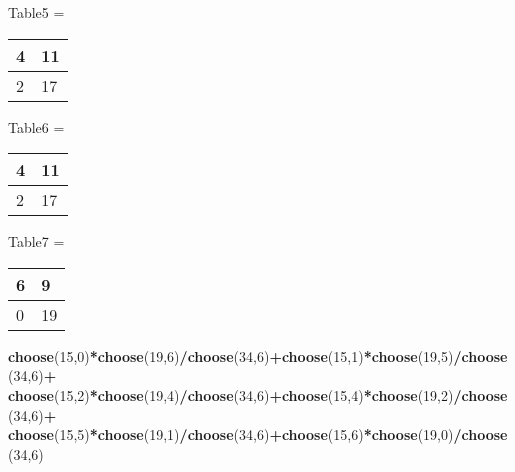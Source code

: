 \documentclass[]{article}
\newenvironment{Shaded}{\begin{snugshade}}{\end{snugshade}}
\newcommand{\KeywordTok}[1]{\textcolor[rgb]{0.13,0.29,0.53}{\textbf{#1}}}
\newcommand{\DecValTok}[1]{\textcolor[rgb]{0.00,0.00,0.81}{#1}}
\newcommand{\StringTok}[1]{\textcolor[rgb]{0.31,0.60,0.02}{#1}}
\newcommand{\OperatorTok}[1]{\textcolor[rgb]{0.81,0.36,0.00}{\textbf{#1}}}
\newcommand{\NormalTok}[1]{#1}
\begin{document}
Table5 =

\begin{longtable}[]{@{}ll@{}}
\toprule
4 & 11\tabularnewline
\midrule
\endhead
2 & 17\tabularnewline
\bottomrule
\end{longtable}

Table6 =

\begin{longtable}[]{@{}ll@{}}
\toprule
4 & 11\tabularnewline
\midrule
\endhead
2 & 17\tabularnewline
\bottomrule
\end{longtable}

Table7 =

\begin{longtable}[]{@{}ll@{}}
\toprule
6 & 9\tabularnewline
\midrule
\endhead
0 & 19\tabularnewline
\bottomrule
\end{longtable}

\begin{Shaded}
\begin{Highlighting}[]
\KeywordTok{choose}\NormalTok{(}\DecValTok{15}\NormalTok{,}\DecValTok{0}\NormalTok{)}\OperatorTok{*}\KeywordTok{choose}\NormalTok{(}\DecValTok{19}\NormalTok{,}\DecValTok{6}\NormalTok{)}\OperatorTok{/}\KeywordTok{choose}\NormalTok{(}\DecValTok{34}\NormalTok{,}\DecValTok{6}\NormalTok{)}\OperatorTok{+}\KeywordTok{choose}\NormalTok{(}\DecValTok{15}\NormalTok{,}\DecValTok{1}\NormalTok{)}\OperatorTok{*}\KeywordTok{choose}\NormalTok{(}\DecValTok{19}\NormalTok{,}\DecValTok{5}\NormalTok{)}\OperatorTok{/}\KeywordTok{choose}\NormalTok{(}\DecValTok{34}\NormalTok{,}\DecValTok{6}\NormalTok{)}\OperatorTok{+}
\StringTok{  }\KeywordTok{choose}\NormalTok{(}\DecValTok{15}\NormalTok{,}\DecValTok{2}\NormalTok{)}\OperatorTok{*}\KeywordTok{choose}\NormalTok{(}\DecValTok{19}\NormalTok{,}\DecValTok{4}\NormalTok{)}\OperatorTok{/}\KeywordTok{choose}\NormalTok{(}\DecValTok{34}\NormalTok{,}\DecValTok{6}\NormalTok{)}\OperatorTok{+}\KeywordTok{choose}\NormalTok{(}\DecValTok{15}\NormalTok{,}\DecValTok{4}\NormalTok{)}\OperatorTok{*}\KeywordTok{choose}\NormalTok{(}\DecValTok{19}\NormalTok{,}\DecValTok{2}\NormalTok{)}\OperatorTok{/}\KeywordTok{choose}\NormalTok{(}\DecValTok{34}\NormalTok{,}\DecValTok{6}\NormalTok{)}\OperatorTok{+}
\StringTok{  }\KeywordTok{choose}\NormalTok{(}\DecValTok{15}\NormalTok{,}\DecValTok{5}\NormalTok{)}\OperatorTok{*}\KeywordTok{choose}\NormalTok{(}\DecValTok{19}\NormalTok{,}\DecValTok{1}\NormalTok{)}\OperatorTok{/}\KeywordTok{choose}\NormalTok{(}\DecValTok{34}\NormalTok{,}\DecValTok{6}\NormalTok{)}\OperatorTok{+}\KeywordTok{choose}\NormalTok{(}\DecValTok{15}\NormalTok{,}\DecValTok{6}\NormalTok{)}\OperatorTok{*}\KeywordTok{choose}\NormalTok{(}\DecValTok{19}\NormalTok{,}\DecValTok{0}\NormalTok{)}\OperatorTok{/}\KeywordTok{choose}\NormalTok{(}\DecValTok{34}\NormalTok{,}\DecValTok{6}\NormalTok{)}
\end{Highlighting}
\end{Shaded}
\end{document}
